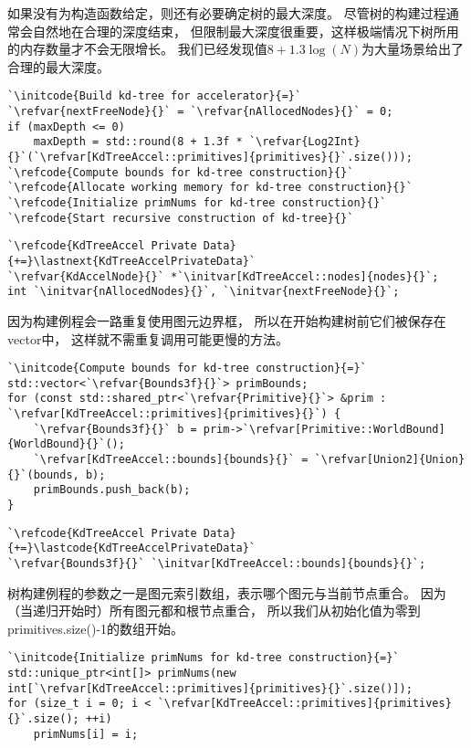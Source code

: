 如果没有为构造函数给定，则还有必要确定树的最大深度。
尽管树的构建过程通常会自然地在合理的深度结束，
但限制最大深度很重要，这样极端情况下树所用的内存数量才不会无限增长。
我们已经发现值$8+1.3\log(N)$为大量场景给出了合理的最大深度。

\begin{lstlisting}
`\initcode{Build kd-tree for accelerator}{=}`
`\refvar{nextFreeNode}{}` = `\refvar{nAllocedNodes}{}` = 0;
if (maxDepth <= 0)
    maxDepth = std::round(8 + 1.3f * `\refvar{Log2Int}{}`(`\refvar[KdTreeAccel::primitives]{primitives}{}`.size()));
`\refcode{Compute bounds for kd-tree construction}{}`
`\refcode{Allocate working memory for kd-tree construction}{}`
`\refcode{Initialize primNums for kd-tree construction}{}`
`\refcode{Start recursive construction of kd-tree}{}`
\end{lstlisting}

\begin{lstlisting}
`\refcode{KdTreeAccel Private Data}{+=}\lastnext{KdTreeAccelPrivateData}`
`\refvar{KdAccelNode}{}` *`\initvar[KdTreeAccel::nodes]{nodes}{}`;
int `\initvar{nAllocedNodes}{}`, `\initvar{nextFreeNode}{}`;
\end{lstlisting}

因为构建例程会一路重复使用图元边界框，
所以在开始构建树前它们被保存在{\ttfamily vector}中，
这样就不需重复调用可能更慢的方法。
\begin{lstlisting}
`\initcode{Compute bounds for kd-tree construction}{=}`
std::vector<`\refvar{Bounds3f}{}`> primBounds;
for (const std::shared_ptr<`\refvar{Primitive}{}`> &prim : `\refvar[KdTreeAccel::primitives]{primitives}{}`) {
    `\refvar{Bounds3f}{}` b = prim->`\refvar[Primitive::WorldBound]{WorldBound}{}`();
    `\refvar[KdTreeAccel::bounds]{bounds}{}` = `\refvar[Union2]{Union}{}`(bounds, b);
    primBounds.push_back(b);
}
\end{lstlisting}

\begin{lstlisting}
`\refcode{KdTreeAccel Private Data}{+=}\lastcode{KdTreeAccelPrivateData}`
`\refvar{Bounds3f}{}` `\initvar[KdTreeAccel::bounds]{bounds}{}`;
\end{lstlisting}

树构建例程的参数之一是图元索引数组，表示哪个图元与当前节点重合。
因为（当递归开始时）所有图元都和根节点重合，
所以我们从初始化值为零到{\ttfamily primitives.size()-1}的数组开始。
\begin{lstlisting}
`\initcode{Initialize primNums for kd-tree construction}{=}`
std::unique_ptr<int[]> primNums(new int[`\refvar[KdTreeAccel::primitives]{primitives}{}`.size()]);
for (size_t i = 0; i < `\refvar[KdTreeAccel::primitives]{primitives}{}`.size(); ++i)
    primNums[i] = i;
\end{lstlisting}

